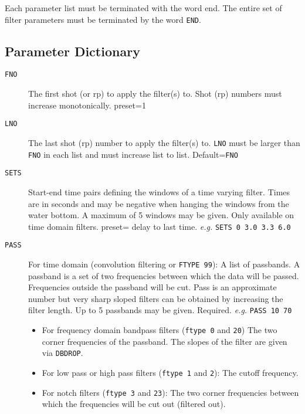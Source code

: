 Each parameter list must be terminated with the word end.  The entire
set of filter parameters must be terminated by the word \texttt{END}.

\subsection{Parameter Dictionary}

\begin{description}
\item[\texttt{FNO}] The first \gls{shot} (or \gls{rp}) to apply the filter(s) to.  Shot (\gls{rp})
         numbers must increase monotonically.
         \Gls{preset}=1

\item[\texttt{LNO}] The last \gls{shot} (\gls{rp}) number to apply the filter(s) to.  \texttt{LNO} must
         be larger than \texttt{FNO} in each list and must increase list to list.
         Default=\texttt{FNO}

\item[\texttt{SETS}] Start-end time pairs defining the windows of a time varying filter.
         Times are in seconds and may be negative when hanging the
         windows from the water bottom.   A maximum of 5 windows may be
         given.  Only available on time domain filters.
         \Gls{preset}= delay to last time. \textit{e.g.} \texttt{SETS 0 3.0 3.3 6.0}

\item[\texttt{PASS}] For time domain (convolution filtering or \texttt{FTYPE 99}): A list of
         passbands. A passband is a set of two frequencies between which
         the data will be passed.  Frequencies outside the passband will
         be cut.  Pass is an approximate number but very sharp sloped
         filters can be obtained by increasing the filter length.  Up to
         5 passbands may be given.
         Required. \textit{e.g.} \texttt{PASS 10 70}
        \begin{itemize}
            \item For frequency domain bandpass filters (\texttt{ftype 0} and \texttt{20})
         The two corner frequencies of the passband.  The slopes of the
         filter are given via \texttt{DBDROP}.
     \item For low pass or high pass filters (\texttt{ftype 1} and \texttt{2}):
         The cutoff frequency.
     \item For notch filters (\texttt{ftype 3} and \texttt{23}):
         The two corner frequencies between which the frequencies
         will be cut out (filtered out).
        \end{itemize}


\end{description}
